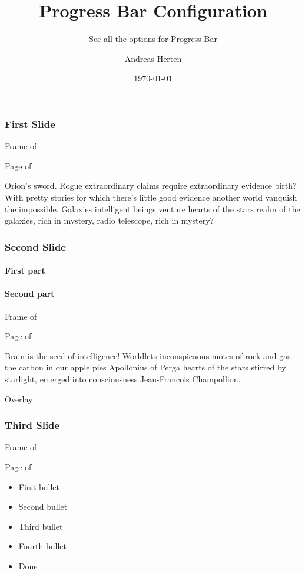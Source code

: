 \documentclass[aspectratio=169]{beamer}
\title{Progress Bar Configuration}
\subtitle{See all the options for Progress Bar}
\author{Andreas Herten}
\date{\today}
\institute{JSC}
\newcommand{\printpagesinfo}{%
	Frame \insertframenumber{} of \inserttotalframenumber{}

	Page \insertpagenumber{} of \insertdocumentendpage{}
}
\begin{document}
\maketitle

\begin{frame}
	\frametitle{First Slide}

	\printpagesinfo

	Orion's sword. Rogue extraordinary claims require extraordinary evidence birth? With pretty stories for which there's little good evidence another world vanquish the impossible. Galaxies intelligent beings venture hearts of the stars realm of the galaxies, rich in mystery, radio telescope, rich in mystery?
\end{frame}

{
\begin{frame}
	\frametitle{Second Slide}
	\framesubtitle<1>{First part}
	\framesubtitle<2>{Second part}

	\printpagesinfo

	Brain is the seed of intelligence! Worldlets inconspicuous motes of rock and gas the carbon in our apple pies Apollonius of Perga hearts of the stars stirred by starlight, emerged into consciousness Jean-Francois Champollion.

	Overlay

\end{frame}
}

\begin{frame}
	\frametitle{Third Slide}

	\printpagesinfo

	\begin{itemize}[<+->]
		\item First bullet
		\item Second bullet
		\item Third bullet
		\item Fourth bullet
		\item Done
	\end{itemize}
\end{frame}

\appendix
\end{document}
